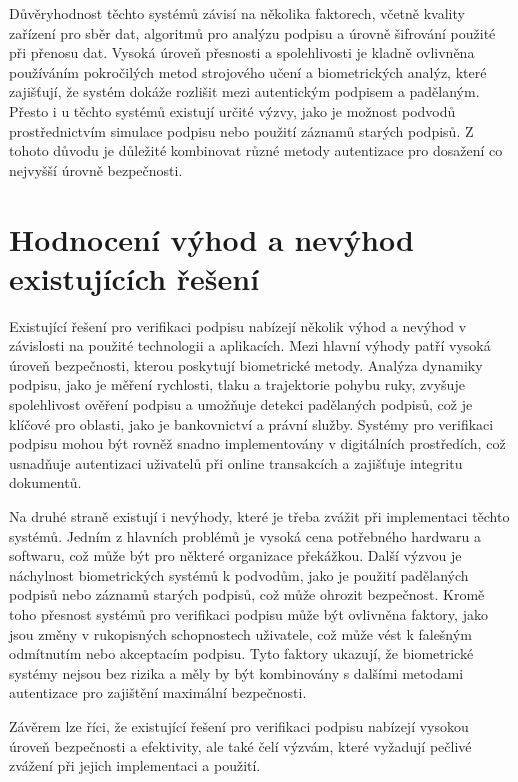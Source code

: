 Důvěryhodnost těchto systémů závisí na několika faktorech, včetně kvality zařízení pro sběr dat, algoritmů pro analýzu podpisu a úrovně šifrování použité při přenosu dat. 
Vysoká úroveň přesnosti a spolehlivosti je kladně ovlivněna používáním pokročilých metod strojového učení a biometrických analýz, které zajišťují, že systém dokáže rozlišit mezi autentickým podpisem a padělaným. 
Přesto i u těchto systémů existují určité výzvy, jako je možnost podvodů prostřednictvím simulace podpisu nebo použití záznamů starých podpisů. 
Z tohoto důvodu je důležité kombinovat různé metody autentizace pro dosažení co nejvyšší úrovně bezpečnosti. %

\section{Hodnocení výhod a nevýhod existujících řešení}
Existující řešení pro verifikaci podpisu nabízejí několik výhod a nevýhod v závislosti na použité technologii a aplikacích. 
Mezi hlavní výhody patří vysoká úroveň bezpečnosti, kterou poskytují biometrické metody. 
Analýza dynamiky podpisu, jako je měření rychlosti, tlaku a trajektorie pohybu ruky, zvyšuje spolehlivost ověření podpisu a umožňuje detekci padělaných podpisů, což je klíčové pro oblasti, jako je bankovnictví a právní služby. %
Systémy pro verifikaci podpisu mohou být rovněž snadno implementovány v digitálních prostředích, což usnadňuje autentizaci uživatelů při online transakcích a zajišťuje integritu dokumentů.

Na druhé straně existují i nevýhody, které je třeba zvážit při implementaci těchto systémů. 
Jedním z hlavních problémů je vysoká cena potřebného hardwaru a softwaru, což může být pro některé organizace překážkou. 
Další výzvou je náchylnost biometrických systémů k podvodům, jako je použití padělaných podpisů nebo záznamů starých podpisů, což může ohrozit bezpečnost. %
Kromě toho přesnost systémů pro verifikaci podpisu může být ovlivněna faktory, jako jsou změny v rukopisných schopnostech uživatele, což může vést k falešným odmítnutím nebo akceptacím podpisu. %
Tyto faktory ukazují, že biometrické systémy nejsou bez rizika a měly by být kombinovány s dalšími metodami autentizace pro zajištění maximální bezpečnosti.

Závěrem lze říci, že existující řešení pro verifikaci podpisu nabízejí vysokou úroveň bezpečnosti a efektivity, ale také čelí výzvám, které vyžadují pečlivé zvážení při jejich implementaci a použití.


